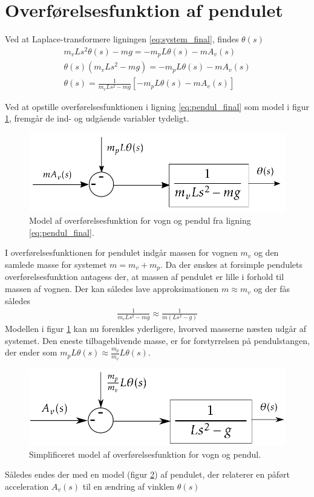 \section{Overførelsesfunktion af pendulet}\label{sec:sec_penduloverforelse}
Ved at Laplace-transformere ligningen \ref{eq:system_final}, findes $\theta(s)$
\begin{align}
 m_vLs^2\theta(s) - mg = -m_pL\theta(s) -mA_v(s) \\
 \theta(s)\left(m_vLs^2 - mg \right) = -m_pL\theta(s) -mA_v(s) \\
 \theta(s) = \frac{1}{m_vLs^2 - mg }\left[-m_pL\theta(s) -mA_v(s)\right] \label{eq:pendul_final}
\end{align} 
 
Ved at opstille overførelsesfunktionen i ligning \ref{eq:pendul_final} som model i figur \ref{fig:pendul_trans1}, fremgår de ind- og udgående variabler tydeligt. 

\begin{figure}[h!]
	\centering
	\includegraphics[width=.6\textwidth]{billeder/pendul_trans1.png}
	\caption[Model af overførelsesfunktion for vogn og pendul.]{Model af overførelsesfunktion for vogn og pendul fra ligning \ref{eq:pendul_final}.}
	\label{fig:pendul_trans1}
\end{figure}
\FloatBlock

I overførelsesfunktionen for pendulet indgår massen for vognen $m_v$ og den samlede masse for systemet $m = m_v + m_p$.
Da der ønskes at forsimple pendulets overførelsesfunktion antagess der, at massen af pendulet er lille i forhold til massen af vognen. 
Der kan således lave approksimationen $m \approx m_v$ og der fås således
\begin{align}
\frac{1}{m_vLs^2 - mg } \approx  \frac{1}{m \left( Ls^2 - g \right) }
\end{align}     
Modellen i figur \ref{fig:pendul_trans1} kan nu forenkles yderligere, hvorved masserne næsten udgår af systemet.
Den eneste tilbageblivende masse, er for forstyrrelsen på pendulstangen, der ender som $m_pL\theta(s) \approx  \frac{m_p}{m_v}L\theta(s) $.

\begin{figure}[h!]
	\centering
	\includegraphics[width=.6\textwidth]{billeder/pendul_trans_clean.png}
	\caption{Simplificeret model af overførelsesfunktion for vogn og pendul.}
	\label{fig:pendul_trans_clean}
\end{figure}
\FloatBlock 
Således endes der med en model (figur \ref{fig:pendul_trans_clean}) af pendulet, der relaterer en påført acceleration $A_v(s)$ til en ændring af vinklen $\theta(s)$
